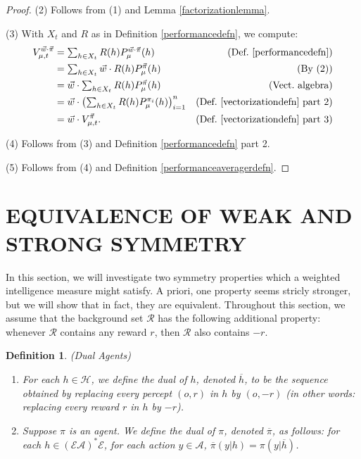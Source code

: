 \documentclass[twoside]{article}
\newtheorem{definition}[theorem]{Definition}
\begin{document}
\begin{proof}
    (2) Follows from (1) and Lemma \ref{factorizationlemma}.

    (3) With $X_t$ and $R$ as in Definition \ref{performancedefn}, we compute:
    \begin{align*}
        V^{\vec w\cdot\vec\pi}_{\mu,t}
            &= \mbox{$\sum_{h\in X_t}R(h)P^{\vec w\cdot\vec\pi}_\mu(h)$}
                &\mbox{(Def.\ \ref{performancedefn})}\\
            &= \mbox{$\sum_{h\in X_t}\vec w\cdot R(h)P^{\vec\pi}_\mu(h)$}
                &\mbox{(By (2))}\\
            &= \mbox{$\vec w\cdot \sum_{h\in X_t}R(h)P^{\vec\pi}_\mu(h)$}
                &\mbox{(Vect.\ algebra)}\\
            &= \mbox{$
                \vec w\cdot
                \left(
                    \sum_{h\in X_t}R(h)P^{\pi_i}_\mu(h)
                \right)_{i=1}^n
                $}
                &\mbox{(Def.\ \ref{vectorizationdefn} part 2)}\\
            &= \vec w\cdot V^{\vec\pi}_{\mu,t}.
                &\mbox{(Def.\ \ref{vectorizationdefn} part 3)}
    \end{align*}

    (4) Follows from (3) and Definition \ref{performancedefn} part 2.

    (5) Follows from (4) and Definition \ref{performanceaveragerdefn}.
\end{proof}

\section{EQUIVALENCE OF WEAK AND STRONG SYMMETRY}

In this section, we will investigate two symmetry properties
which a weighted intelligence measure might satisfy. A priori, one
property seems stricly stronger, but we will show
that in fact, they are equivalent. Throughout this section, we
assume that the background set $\mathcal R$ has the following
additional property:
whenever $\mathcal R$ contains any reward $r$, then $\mathcal R$
also contains $-r$.

\begin{definition}
\label{dualagentsdefn}
(Dual Agents)
\begin{enumerate}
    \item
    For each $h\in\mathcal H$,
    we define the \emph{dual} of $h$, denoted $\overline h$, to be
    the sequence obtained
    by replacing every percept $(o,r)$ in $h$ by $(o,-r)$ (in other words:
    replacing every reward $r$ in $h$ by $-r$).
    \item
    Suppose $\pi$ is an agent.
    We define the \emph{dual} of $\pi$, denoted $\overline \pi$, as follows:
    for each $h\in (\mathcal E\mathcal A)^*\mathcal E$,
    for each action $y\in\mathcal A$,
    $\overline\pi(y|h)=\pi(y|\overline h)$.
\end{enumerate}
\end{definition}
\end{document}

